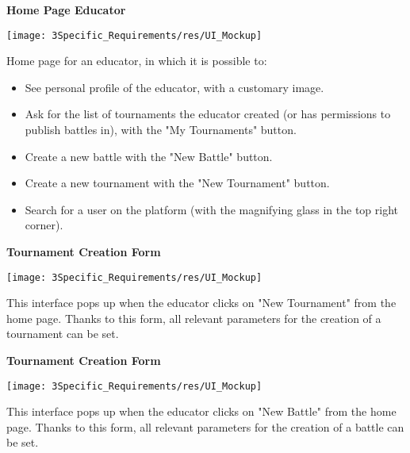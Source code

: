 \vspace{1cm}

\begin{minipage}{\linewidth}
	\textbf{Home Page Educator}
	\begin{center}
		\texttt{[image: 3Specific\_Requirements/res/UI\_Mockup]}
		
	\end{center}
	Home page for an educator, in which it is possible to:
	\begin{itemize}
		\item See personal profile of the educator, with a customary image.
		\item Ask for the list of tournaments the educator created (or has permissions to publish battles in), with the "My Tournaments" button.
		\item Create a new battle with the "New Battle" button. 
		\item Create a new tournament with the "New Tournament" button.
		\item Search for a user on the platform (with the magnifying glass in the top right corner). 
	\end{itemize}
\end{minipage}

\vspace{1cm}

\begin{minipage}{\linewidth}
	\textbf{Tournament Creation Form}
	\begin{center}
		\texttt{[image: 3Specific\_Requirements/res/UI\_Mockup]}
		
	\end{center}
 	This interface pops up when the educator clicks on "New Tournament" from the home page. Thanks to this form, all relevant parameters for the creation of a tournament can be set.

\end{minipage}

\vspace{1cm}

\begin{minipage}{\linewidth}
	\textbf{Tournament Creation Form}
	\begin{center}
		\texttt{[image: 3Specific\_Requirements/res/UI\_Mockup]}
		
	\end{center}
	This interface pops up when the educator clicks on "New Battle" from the home page. Thanks to this form, all relevant parameters for the creation of a battle can be set.
	
\end{minipage}